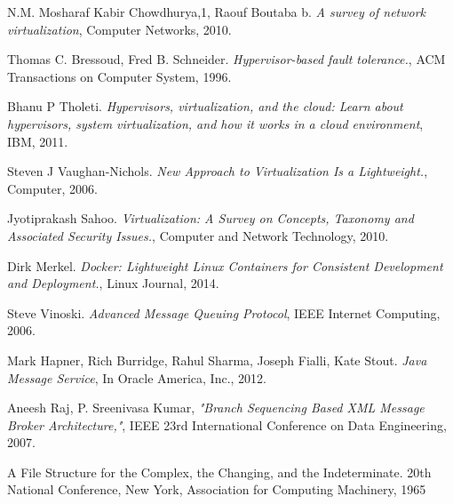 \documentclass[a4paper,11pt,twoside]{article}
\begin{document}
\begin{thebibliography}{1}
	 N.M. Mosharaf Kabir Chowdhurya,1, Raouf Boutaba b. {\em A survey of network virtualization}, Computer Networks, 2010.
   
	 Thomas C. Bressoud, Fred B. Schneider. {\em Hypervisor-based fault tolerance.}, ACM 	Transactions on Computer System, 1996.
	   
  	 Bhanu P Tholeti. {\em Hypervisors, virtualization, and the cloud: Learn about hypervisors, system virtualization, and how it works in a cloud environment}, IBM, 2011. 

	  Steven J Vaughan-Nichols. {\em New Approach to Virtualization Is a Lightweight.}, Computer, 2006.  
	 
	   Jyotiprakash Sahoo. {\em Virtualization: A Survey on Concepts, Taxonomy and Associated Security Issues.}, Computer and Network Technology, 2010.
  
    Dirk Merkel. {\em Docker: Lightweight Linux Containers for Consistent Development and Deployment.}, Linux Journal, 2014.
	
	 Steve Vinoski. {\em Advanced Message Queuing Protocol}, IEEE Internet Computing, 2006. 

     Mark Hapner, Rich Burridge, Rahul Sharma, Joseph Fialli, Kate Stout. {\em Java Message Service}, In Oracle America, Inc., 2012.

 Aneesh Raj, P. Sreenivasa Kumar, {\em "Branch Sequencing Based XML Message Broker Architecture,"}, IEEE 23rd International Conference on Data Engineering, 2007.  

 A File Structure for the Complex, the Changing, and the Indeterminate. 20th National Conference, New York, Association for Computing Machinery, 1965
  
  \end{thebibliography}
\end{document}
